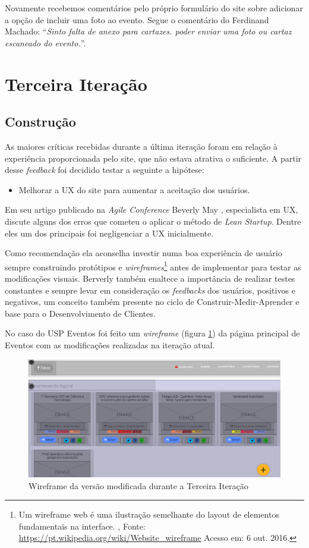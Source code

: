 \par Novamente recebemos comentários pelo próprio formulário do site sobre adicionar a opção de incluir uma foto ao evento. Segue o comentário do Ferdinand Machado: ``\emph{Sinto falta de anexo para cartazes. poder enviar uma foto ou cartaz escaneado do evento.}''.

\section{Terceira Iteração}
\subsection{Construção}
	\par As maiores críticas recebidas durante a última iteração foram em relação à experiência proporcionada pelo site, que não estava atrativa o suficiente. A partir desse \emph{feedback} foi decidido testar a seguinte a hipótese:
	\begin{itemize}
	\item Melhorar a UX do site para aumentar a aceitação dos usuários.
	\end{itemize}
	\par Em seu artigo publicado na \emph{Agile Conference} Beverly May \citep{beverly:2012}, especialista em UX, discute alguns dos erros que cometeu o aplicar o método de \emph{Lean Startup}. Dentre eles um dos principais foi negligenciar a UX inicialmente. 
	\par Como recomendação ela aconselha investir numa boa experiência de usuário sempre construindo protótipos e \emph{wireframes}\footnote{ Um wireframe web é uma ilustração semelhante do layout de elementos fundamentais na interface. , Fonte: \url{https://pt.wikipedia.org/wiki/Website_wireframe} Acesso em: 6 out. 2016.} antes de implementar para testar as modificações visuais. Berverly também enaltece a importância de realizar testes constantes e sempre levar em consideração os \emph{feedbacks} dos usuários, positivos e negativos, um conceito também presente no ciclo de Construir-Medir-Aprender e base para o Desenvolvimento de Clientes.
	\par No caso do USP Eventos foi feito um \emph{wireframe} (figura \ref{fig:wireframe}) da página principal de Eventos com as modificações realizadas na iteração atual.
\begin{figure}[htb]
\centering
\includegraphics[width=15cm]{figuras/wireframe}
\caption{\label{fig:wireframe} Wireframe da versão modificada durante a Terceira Iteração}
\end{figure}
